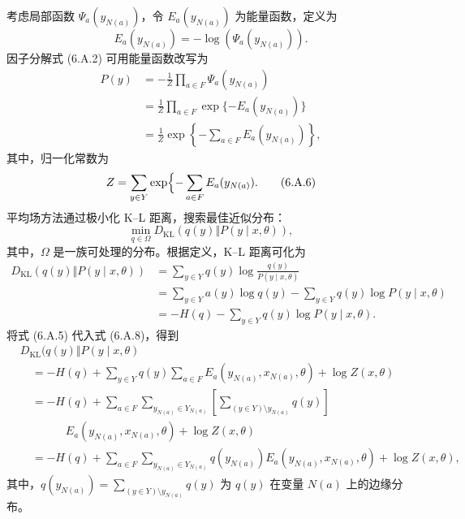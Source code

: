 考虑局部函数 $\Psi_a(y_{N(a)})$，令 $E_a(y_{N(a)})$ 为能量函数，定义为
\begin{equation}
E_a(y_{N(a)})=-\log(\Psi_a(y_{N(a)})).
\tag{6.A.4}
\end{equation}
因子分解式 (6.A.2) 可用能量函数改写为
\begin{equation}
\begin{aligned}
P(y)&=-\frac1Z\prod_{a\in F}\Psi_a(y_{N(a)})\\
&=\frac1Z\prod_{a\in F}\exp\{-E_a(y_{N(a)})\}\\
&=\frac1Z\exp\left\{-\sum_{a\in F}E_a(y_{N(a)})\right\},
\end{aligned}\tag{6.A.5}
\end{equation}
其中，归一化常数为
\begin{equation}
Z=\sum_{y\in Y}\exp\Bigl\{-\sum_{a\in F}E_a(y_{N(a)}).
\tag{6.A.6}
\end{equation}
平均场方法通过极小化 K–L 距离，搜索最佳近似分布：
\begin{equation}
\min_{q\in\Omega}D_{\mathrm{KL}}(q(y)\Vert P(y\mid x,\theta)),
\tag{6.A.7}
\end{equation}
其中，$\Omega$ 是一族可处理的分布。根据定义，K–L 距离可化为
\begin{equation}
\begin{aligned}
D_{\mathrm{KL}}(q(y)\Vert P(y\mid x,\theta))&=\sum_{y\in Y}q(y)\log\frac{q(y)}{P(y\mid x,\theta)}\\
&=\sum_{y\in Y}a(y)\log q(y)-\sum_{y\in Y}q(y)\log P(y\mid x,\theta)\\
&=-H(q)-\sum_{y\in Y}q(y)\log P(y\mid x,\theta).
\end{aligned}\tag{6.A.8}
\end{equation}
将式 (6.A.5) 代入式 (6.A.8)，得到
\begin{equation}
\begin{aligned}
&D_{\mathrm{KL}}(q(y)\Vert P(y\mid x,\theta)\\
&\quad=-H(q)+\sum_{y\in Y}q(y)\sum_{a\in F}E_a(y_{N(a)},x_{N(a)},\theta)+\log Z(x,\theta)\\
&\quad=-H(q)+\sum_{a\in F}\sum_{y_{N(a)}\in Y_{N(a)}}\left[\sum_{(y\in Y)\setminus y_{N(a)}}q(y)\right]\\
&\qquad\qquad E_a(y_{N(a)},x_{N(a)},\theta)+\log Z(x,\theta)\\
&\quad=-H(q)+\sum_{a\in F}\sum_{y_{N(a)}\in Y_{N(a)}}q(y_{N(a)})E_a(y_{N(a)},x_{N(a)},\theta)+\log Z(x,\theta),
\end{aligned}\tag{6.A.9}
\end{equation}
其中，$q(y_{N(a)})=\sum_{(y\in Y)\setminus y_{N(a)}}q(y)$ 为 $q(y)$ 在变量 $N(a)$ 上的边缘分布。

